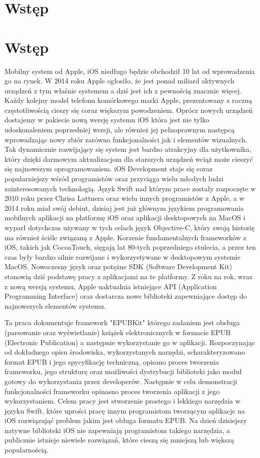 \chapter{Wstęp}

\chapter{Wstęp}

Mobilny system od Apple, iOS niedługo będzie obchodził 10 lat od wprowadzenia go na rynek. W 2014 roku Apple ogłosiło, że jest ponad miliard aktywnych urządzeń z tym właśnie systemem a dziś jest ich z pewnością znacznie więcej. Każdy kolejny model telefonu komórkowego marki Apple, prezentowany z roczną częstotliwością cieszy się coraz większym powodzeniem. Oprócz nowych urządzeń dostajemy w pakiecie nową wersję systemu iOS która jest nie tylko udoskonaleniem poprzedniej wersji, ale również jej pełnoprawnym następcą wprowadzając nowy zbiór zarówno funkcjonalności jak i elementów wizualnych. Tak dynamicznie rozwijający się system jest bardzo atrakcyjny dla użytkownika, który dzięki darmowym aktualizacjom dla starszych urządzeń wciąż może cieszyć się najnowszym oprogramowaniem. iOS Development staje się coraz popularniejszy wśród programistów oraz przyciąga wielu młodych ludzi zainteresowanych technologią. Język Swift nad którym prace zostały rozpoczęte w 2010 roku przez Chrisa Lattnera oraz wielu innych programistów z Apple, a w 2014 roku miał swój debiut, dzisiaj jest już głównym językiem programowania mobilnych aplikacji na platformę iOS oraz aplikacji desktopowych na MacOS i wyparł dotychczas używany w tych celach język Objective-C, który swoją historię ma również ściśle związaną z Apple. Korzenie fundamentalnych frameworków z iOS, takich jak CocoaTouch, sięgają lat 80-tych poprzedniego stulecia, a przez ten czas były bardzo silnie rozwijane i wykorzystywane w desktopowym systemie MacOS. Nowoczesny język oraz potężne SDK (Software Development Kit) stanowią dziś podstawę pracy z aplikacjami na te platformy. Z roku na rok, wraz z nową wersją systemu, Apple uaktualnia istniejące API (Application Programming Interface) oraz dostarcza nowe biblioteki zapewniające dostęp do najnowszych elementów systemu.


Ta praca dokumentuje framework "EPUBKit" którego zadaniem jest obsługa (parsowanie oraz wyświetlanie) książek elektronicznych w formacie EPUB (Electronic Publication) a następnie wykorzystanie go w aplikacji. Rozpoczynając od dokładnego opisu środowiska, wykorzystanych narzędzi, scharakteryzowano format EPUB i jego spycyfikację techniczną, opisano proces tworzenia frameworku, jego strukturę oraz możliwości dystrybucji biblioteki jako moduł gotowy do wykorzystania przez developerów. Następnie w celu demonstracji funkcjonalności frameworku opinasno proces tworzenia aplikacji z jego wykorzystaniem. Celem pracy jest stworzenie prostego i lekkiego narzędzia w języku Swift, które uprości pracę innym programistom tworzącym aplikacje na iOS rozwiązująć problem jakim jest obługa formatu EPUB. Na dzień dzisiejszy natywne biblioteki iOS nie zapewniają programistom takiego narzędzia, a publicznie istnieje niewiele rozwiązań, które cieszą się mniejszą lub większą popularnością.
